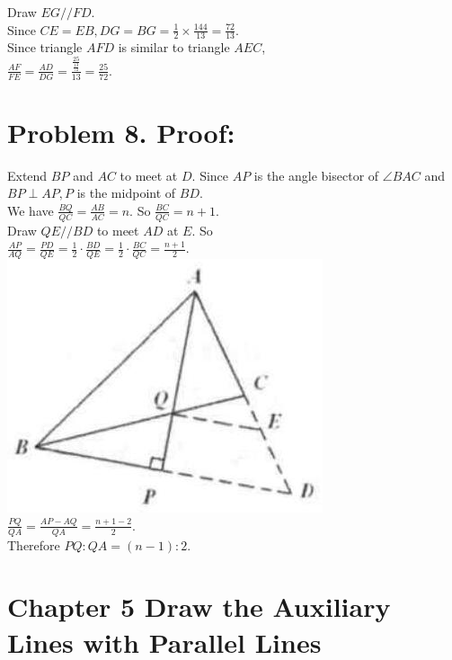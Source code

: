 \documentclass[10pt]{article}
\begin{document}
Draw \(E G / / F D\).\\
Since \(C E=E B, D G=B G=\frac{1}{2} \times \frac{144}{13}=\frac{72}{13}\).\\
Since triangle \(A F D\) is similar to triangle \(A E C\),\\
\(\frac{A F}{F E}=\frac{A D}{D G}=\frac{\frac{25}{\frac{13}{72}}}{13}=\frac{25}{72}\).

\section*{Problem 8. Proof:}
Extend \(B P\) and \(A C\) to meet at \(D\). Since \(A P\) is the angle bisector of \(\angle B A C\) and \(B P \perp A P, P\) is the midpoint of \(B D\).\\
We have \(\frac{B Q}{Q C}=\frac{A B}{A C}=n\). So \(\frac{B C}{Q C}=n+1\).\\
Draw \(Q E / / B D\) to meet \(A D\) at \(E\). So\\
\(\frac{A P}{A Q}=\frac{P D}{Q E}=\frac{1}{2} \cdot \frac{B D}{Q E}=\frac{1}{2} \cdot \frac{B C}{Q C}=\frac{n+1}{2}\).\\
\includegraphics[max width=\textwidth, center]{2025_04_17_97bc1f7e44d93c271a88g-134(1)}\\
\(\frac{P Q}{Q A}=\frac{A P-A Q}{Q A}=\frac{n+1-2}{2}\).\\
Therefore \(P Q: Q A=(n-1): 2\).

\section*{Chapter 5 Draw the Auxiliary Lines with Parallel Lines}
\end{document}
